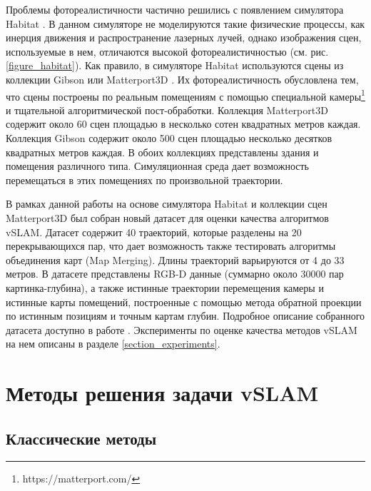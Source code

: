 \documentclass{mipt-thesis-ms}
\begin{document}
	Проблемы фотореалистичности частично решились с появлением симулятора Habitat \cite{savva2019habitat}. В данном симуляторе не моделируются такие физические процессы, как инерция движения и распространение лазерных лучей, однако изображения сцен, используемые в нем, отличаются высокой фотореалистичностью (см. рис. \ref{figure_habitat}). Как правило, в симуляторе Habitat используются сцены из коллекции Gibson \cite{xia2018gibson} или Matterport3D \cite{chang2017matterport3d}. Их фотореалистичность обусловлена тем, что сцены построены по реальным помещениям с помощью специальной камеры\footnote{https://matterport.com/} и тщательной алгоритмической пост-обработки. Коллекция Matterport3D содержит около 60 сцен площадью в несколько сотен квадратных метров каждая. Коллекция Gibson содержит около 500 сцен площадью несколько десятков квадратных метров каждая. В обоих коллекциях представлены здания и помещения различного типа. Симуляционная среда дает возможность перемещаться в этих помещениях по произвольной траектории.
	
	В рамках данной работы на основе симулятора Habitat и коллекции сцен Matterport3D был собран новый датасет для оценки качества алгоритмов vSLAM. Датасет содержит 40 траекторий, которые разделены на 20 перекрывающихся пар, что дает возможность также тестировать алгоритмы объединения карт (Map Merging). Длины траекторий варьируются от 4 до 33 метров. В датасете представлены RGB-D данные (суммарно около 30000 пар картинка-глубина), а также истинные траектории перемещения камеры и истинные карты помещений, построенные с помощью метода обратной проекции по истинным позициям и точным картам глубин. Подробное описание собранного датасета доступно в работе \cite{bokovoy2021maomaps}. Эксперименты по оценке качества методов vSLAM на нем описаны в разделе \ref{section_experiments}.
	
	
	\chapter{Методы решения задачи vSLAM}
	
	\section{Классические методы}
	
\end{document}
